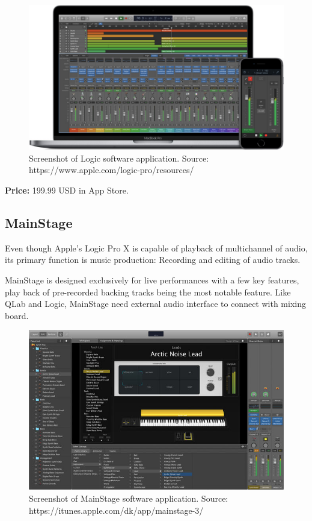 \begin{figure}[H]
\centering
\includegraphics[scale=0.4]{./pictures/logic.png}
\caption{Screenshot of Logic software application. Source: https://www.apple.com/logic-pro/resources/}
\label{fig:logic.png}
\end{figure}

\textbf{Price:} 199.99 USD in App Store. \\

\subsection{MainStage}
Even though Apple's Logic Pro X is capable of playback of multichannel of audio, its primary function is music production: Recording and editing of audio tracks. \newline

MainStage is designed exclusively for live performances with a few key features, play back of pre-recorded backing tracks being the most notable feature. Like QLab and Logic, MainStage need external audio interface to connect with mixing board. \\
 
\begin{figure}[H]
\centering
\includegraphics[scale=0.4]{./pictures/mainstage.png}
\caption{Screenshot of MainStage software application. Source: https://itunes.apple.com/dk/app/mainstage-3/}
\label{fig:mainstage.png}
\end{figure}


